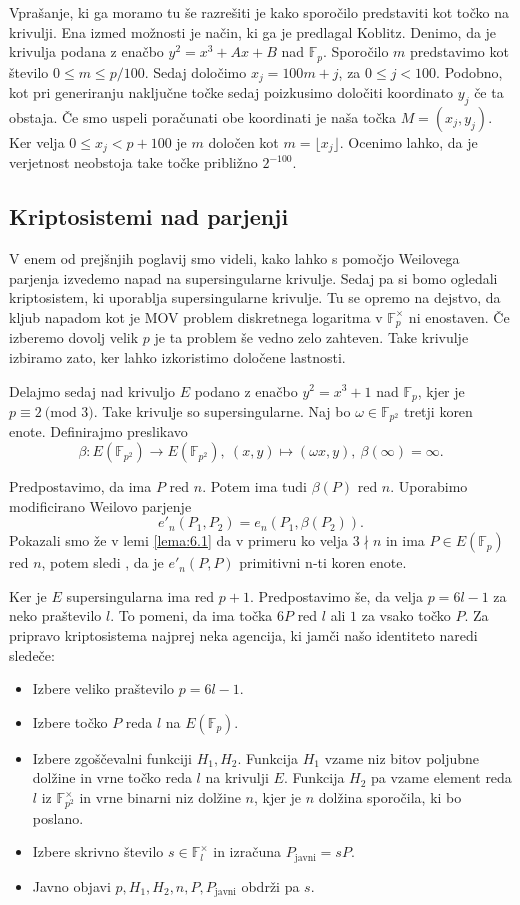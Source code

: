 \documentclass[12pt,a4paper,twoside]{article}
\theoremstyle{definition} %
\theoremstyle{plain} %
\numberwithin{equation}{section}  %
\newcommand{\F}{\mathbb F}
\newcommand{\E}[1]{E({#1})}
\newcommand{\MOD}[1]{\ \text{(mod }{#1}\text{)}}
\begin{document}
Vprašanje, ki ga moramo tu še razrešiti je kako sporočilo predstaviti kot točko na krivulji. Ena izmed možnosti je način, ki ga je predlagal Koblitz. Denimo, da je krivulja podana z enačbo
$y^2 = x^3+Ax+B$ nad $\F_p$. Sporočilo $m$ predstavimo kot število $0 \leq m \leq p/100$. Sedaj določimo $x_j = 100m+j$, za $0\leq j < 100$. Podobno, kot pri generiranju naključne točke sedaj poizkusimo določiti koordinato $y_j$ če ta obstaja. Če smo uspeli poračunati obe koordinati je naša točka $M=(x_j,y_j)$. Ker velja $0\leq x_j < p+100$ je $m$ določen kot
$m = \lfloor x_j \rfloor$.
Ocenimo lahko, da je verjetnost neobstoja take točke približno $2^{-100}$.

\subsection{Kriptosistemi nad parjenji}

V enem od prejšnjih poglavij smo videli, kako lahko s pomočjo Weilovega parjenja izvedemo napad na supersingularne krivulje. Sedaj pa si bomo ogledali kriptosistem, ki uporablja supersingularne krivulje. Tu se opremo na dejstvo, da kljub napadom kot je MOV problem diskretnega logaritma v $\F^{\times}_p$ ni enostaven. Če izberemo dovolj velik $p$ je ta problem še vedno zelo zahteven. Take krivulje izbiramo zato, ker lahko izkoristimo določene lastnosti.

Delajmo sedaj nad krivuljo $E$ podano z enačbo $y^2=x^3+1$ nad $\F_p$, kjer je $p \equiv 2 \MOD{3}$. Take krivulje so supersingularne. Naj bo $\omega \in \F_{p^2}$ tretji koren enote. Definirajmo preslikavo
$$\beta:\E{\F_{p^2}} \rightarrow \E{\F_{p^2}}, \ (x,y) \mapsto (\omega x,y), \ \beta(\infty) = \infty.$$

Predpostavimo, da ima $P$ red $n$. Potem ima tudi $\beta(P)$ red $n$. Uporabimo modificirano Weilovo parjenje
$$e'_n(P_1,P_2)  =e_n(P_1,\beta(P_2)).$$
Pokazali smo že v lemi \ref{lema:6.1} da v primeru ko velja $3 \nmid n$ in ima $P \in \E{\F_p}$ red $n$, potem sledi , da je $e'_n(P,P)$ primitivni n-ti koren enote.

Ker je $E$ supersingularna ima red $p+1$. Predpostavimo še, da velja $p = 6l-1$ za neko praštevilo $l$. To pomeni, da ima točka $6P$ red $l$ ali $1$ za vsako točko $P$.
Za pripravo kriptosistema najprej neka agencija, ki jamči našo identiteto naredi sledeče:
\begin{itemize}
\item Izbere veliko praštevilo $p = 6l-1$.
\item Izbere točko $P$ reda $l$ na $\E{\F_p}$.
\item Izbere zgoščevalni funkciji $H_1, H_2$. Funkcija $H_1$ vzame niz bitov poljubne dolžine in vrne točko reda $l$ na krivulji $E$. Funkcija $H_2$ pa vzame element reda $l$ iz $\F^{\times}_{p^2}$ in vrne binarni niz dolžine $n$, kjer je $n$ dolžina sporočila, ki bo poslano.
\item Izbere skrivno število $s\in \F^{\times}_l$ in izračuna $P_{\text{javni}} = sP$.
\item Javno objavi $p,H_1,H_2,n,P,P_{\text{javni}}$ obdrži pa $s$.
\end{itemize}
\end{document}
